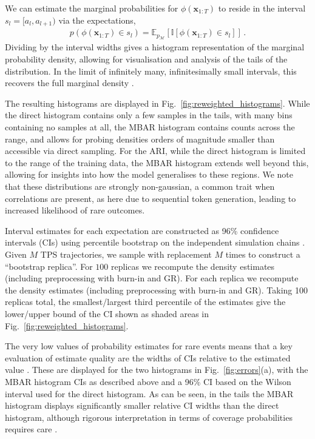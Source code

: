 \documentclass{article}
\newcommand{\realtraj}{\mathbf{x}}
\newcommand{\pdfmodel}{p_{\mathcal{M}}}
\newcommand{\Indf}{\mathbb I}
\begin{document}
We can estimate the marginal probabilities for $\phi(\realtraj_{1:T})$ to reside in the interval $s_l = [a_l, a_{l+1})$ via the expectations,
\begin{align}
    p(\phi(\realtraj_{1:T}) \in s_l)
    =
    \mathbb{E}_{\pdfmodel} \left[ \Indf[\phi(\realtraj_{1:T}) \in s_l] \right]
    \, .
    \label{eq:marginal_density}
\end{align}
Dividing by the interval widths gives a histogram representation of the marginal probability density, allowing for visualisation and analysis of the tails of the distribution. In the limit of infinitely many, infinitesimally small intervals, this recovers the full marginal density \cite{dinner2020stratification}.

The resulting histograms are displayed in Fig.~\ref{fig:reweighted_histograms}. While the direct histogram contains only a few samples in the tails, with many bins containing no samples at all, the MBAR histogram contains counts across the range, and allows for probing densities orders of magnitude smaller than accessible via direct sampling. For the ARI, while the direct histogram is limited to the range of the training data, the MBAR histogram extends well beyond this, allowing for insights into how the model generalises to these regions. We note that these distributions are strongly non-gaussian, a common trait when correlations are present, as here due to sequential token generation, leading to increased likelihood of rare outcomes.

Interval estimates for each expectation are constructed as 96\% confidence intervals (CIs) using percentile bootstrap on the independent simulation chains \cite{davison1997bootstrap}.
Given $M$ TPS trajectories, we sample with replacement $M$ times to construct a ``bootstrap replica''. For $100$ replicas we recompute the density estimates (including preprocessing with burn-in and GR). For each replica we recompute the density estimates (including preprocessing with burn-in and GR). Taking 100 replicas total, the smallest/largest third percentile of the estimates give the lower/upper bound of the CI shown as shaded areas in Fig.~\ref{fig:reweighted_histograms}.

The very low values of probability estimates for rare events means that a key evaluation of estimate quality are the widths of CIs relative to the estimated value \cite{mcgrath2024binomial}.
These are displayed for the two histograms in Fig.~\ref{fig:errors}(a), with the MBAR histogram CIs as described above and a 96\% CI based on the Wilson interval \cite{wilson1927probable} used for the direct histogram.
As can be seen, in the tails the MBAR histogram displays significantly smaller relative CI widths than the direct histogram, although rigorous interpretation in terms of coverage probabilities requires care \cite{mcgrath2024binomial}.
\end{document}
